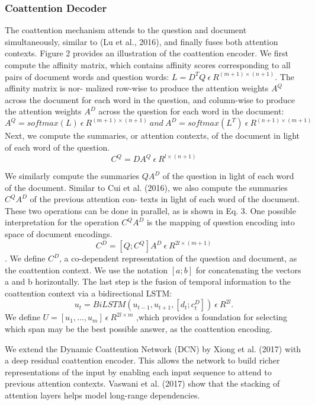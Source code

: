 \documentclass{article} %
\begin{document}
\subsubsection{Coattention Decoder}
The coattention mechanism  attends to the question and document simultaneously, similar to (Lu et al., 2016), and finally fuses both attention contexts. Figure 2 provides an illustration of the coattention encoder.
We first compute the affinity matrix, which contains affinity scores corresponding to all pairs of document words and question words: $ L = D^{T}Q \ \epsilon \  R^{(m+1)\times(n+1)} $. The affinity matrix is nor-
malized row-wise to produce the attention weights $A^{Q}$ across the document for each word in the question, and column-wise to produce the attention weights $A^{D}$ across the question for each word in the document:
$$A^{Q} = softmax (L) \  \epsilon \ R^{(m+1)\times(n+1)} \ and \  A^{D} = softmax(L^{T}) \ \epsilon \ R^{(n+1)\times(m+1)}  $$
Next, we compute the summaries, or attention contexts, of the document in light of each word of the question.
$$C^{Q} = DA^{Q} \  \epsilon \  R^{l\times(n+1)}$$


We similarly compute the summaries $QA^{D}$ of the question in light of each word of the document. Similar to Cui et al. (2016), we also compute the summaries $C^{Q}A^{D}$ of the previous attention con- texts in light of each word of the document. These two operations can be done in parallel, as is shown in Eq. 3. One possible interpretation for the operation $C^{Q}A^{D}$ is the mapping of question encoding into space of document encodings.
$$C^{D} = [Q;C^{Q}] A^{D} \ \epsilon \ R^{2l\times(m+1)}$$. We define $C^{D}$, a co-dependent representation of the question and document, as the coattention
context. We use the notation $[a; b]$ for concatenating the vectors a and b horizontally.
The last step is the fusion of temporal information to the coattention context via a bidirectional
LSTM: $$
u_{t} = BiLSTM ( u_{t−1}, u_{t+1},  [d_{t}; c^{D}_{t}])    \ \epsilon \  R^{2l}.$$ We define $U =[u_1,...,u_m]\ \epsilon \ R^{2l \times m} $ ,which provides a foundation for selecting which span may
be the best possible answer, as the coattention encoding.


We extend the Dynamic Coattention Network (DCN)
by Xiong et al. (2017) with a deep residual coattention encoder. This allows the network to build
richer representations of the input by enabling each input sequence to attend to previous attention
contexts. Vaswani et al. (2017) show that the stacking of attention layers helps model long-range dependencies. 
\end{document}
